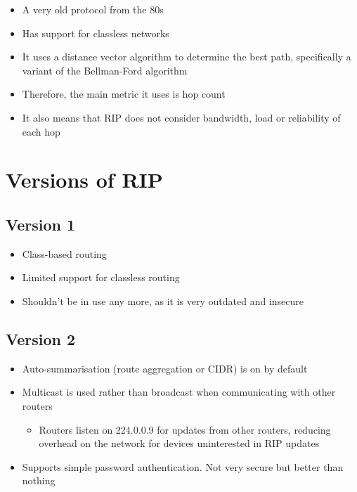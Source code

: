 
\begin{itemize}
  \item A very old protocol from the 80s
  \item Has support for classless networks
  \item It uses a distance vector algorithm to determine the best path, specifically a variant of the Bellman-Ford algorithm
  \item Therefore, the main metric it uses is hop count
  \item It also means that RIP does not consider bandwidth, load or reliability of each hop
\end{itemize}

\section*{Versions of RIP}

\subsection*{Version 1}

\begin{itemize}
  \item Class-based routing
  \item Limited support for classless routing
  \item Shouldn't be in use any more, as it is very outdated and insecure
\end{itemize}

\subsection*{Version 2}

\begin{itemize}
  \item Auto-summarisation (route aggregation or CIDR) is on by default
  \item Multicast is used rather than broadcast when communicating with other routers
  \begin{itemize}
    \item Routers listen on 224.0.0.9 for updates from other routers, reducing overhead on the network for devices uninterested in RIP updates
  \end{itemize}
  \item Supports simple password authentication. Not very secure but better than nothing
\end{itemize}

